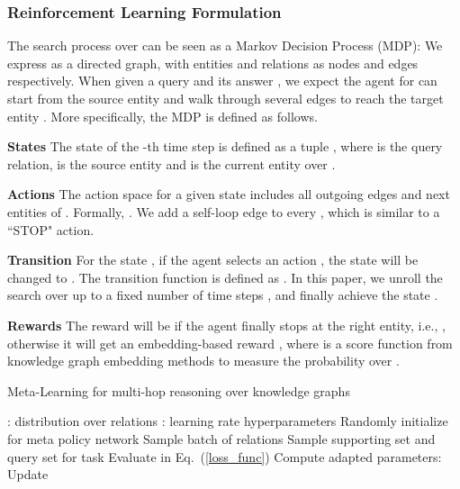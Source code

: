 \documentclass[11pt,a4paper]{article}
\begin{document}
\subsubsection{Reinforcement Learning Formulation}

The search process over  can be seen as a Markov Decision Process (MDP): We express  as a directed graph, with entities and relations as nodes and edges respectively. When given a query and its answer , we expect the agent for  can start from the source entity  and walk through several edges to reach the target entity . More specifically, the MDP is defined as follows.

\textbf{States} \quad The state of the -th time step is defined as a tuple , where  is the query relation,  is the source entity and  is the current entity over . 

\textbf{Actions} \quad The action space  for a given state  includes all outgoing edges and next entities of . Formally,  . We add a self-loop edge to every , which is similar to a ``STOP" action.


\textbf{Transition} \quad For the state , if the agent selects an action , the state will be changed to . The transition function is defined as . 
In this paper, we unroll the search over  up to a fixed number of time steps , and finally achieve the state . 

\textbf{Rewards} \quad The reward  will be  if the agent finally stops at the right entity, i.e., , otherwise it will get an embedding-based reward , where  is a score function from knowledge graph embedding methods to measure the probability over .

\begin{algorithm}[t] 
\small
\caption{Meta-Learning for multi-hop reasoning over knowledge graphs} 
\label{algorithm-kgr}
\begin{algorithmic}[1] 
\Require 
: distribution over relations
\Require 
: learning rate hyperparameters
\State Randomly initialize  for meta policy network
\State Sample batch of relations 
\State Sample supporting set  and query set  for task 
\State Evaluate  in Eq.~(\ref{loss_func})
\State Compute adapted parameters: 
\EndFor
\State Update 
\EndWhile
\end{algorithmic} 
\end{algorithm}
\end{document}
